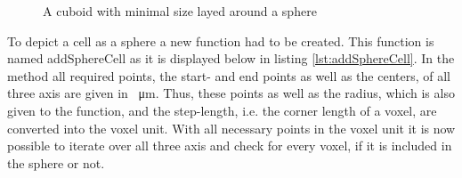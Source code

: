 \begin{figure}[ht]
\begin{center}
\caption[A cuboid with minimal size layed around a sphere in two dimensions]{A cuboid with minimal size layed around a sphere}
\label{tikz:CuboidSphere}
\end{center}
\end{figure}

To depict a cell as a sphere a new function had to be created. This function is named addSphereCell as it is displayed below in listing \ref{lst:addSphereCell}. In the method all required points, the start- and end points as well as the centers, of all three axis are given in \SI{}{\micro\metre}. Thus, these points as well as the radius, which is also given to the function, and the step-length, i.e. the corner length of a voxel, are converted into the voxel unit. \newline
With all necessary points in the voxel unit it is now possible to iterate over all three axis and check for every voxel, if it is included in the sphere or not. \newpage



